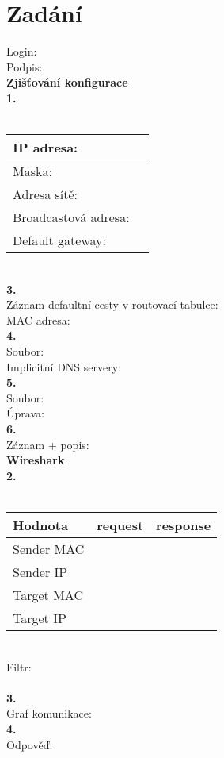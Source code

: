 \section{Zadání}
Login:\\
Podpis:\\

\textbf{Zjišťování konfigurace}\\
\textbf{1.}\\
\\
\begin{tabular}{|l|r|}
\hline
IP adresa: & \hspace{12em} \\
\hline
Maska: & \\
\hline
Adresa sítě: & \\
\hline
Broadcastová adresa: & \\
\hline
Default gateway: & \\
\hline
\end{tabular}
\vspace{1.5em}
\\
\textbf{3.}\\
\vspace{3em}
Záznam defaultní cesty v routovací tabulce:\\
MAC adresa:\\
\textbf{4.}\\
\vspace{8em}
Soubor:\\
Implicitní DNS servery:\\
\textbf{5.}\\
\vspace{4em}
Soubor:\\
Úprava:\\
\textbf{6.}\\
\vspace{5em}
Záznam + popis:\\
\newpage
\noindent
\textbf{Wireshark}\\
\textbf{2.}\\
\\
\begin{tabular}{|l|c|c|}
\hline
\textbf{Hodnota} & \textbf{request} & \textbf{response}\\
\hline
Sender MAC & \hspace{10em} & \hspace{10em} \\
\hline
Sender IP & & \\
\hline
Target MAC & & \\
\hline
Target IP & & \\
\hline
\end{tabular}
\vspace{2em}
\\
Filtr:\\
\\
\textbf{3.}\\
\vspace{25em}
Graf komunikace:\\
\textbf{4.}\\
Odpověď:
